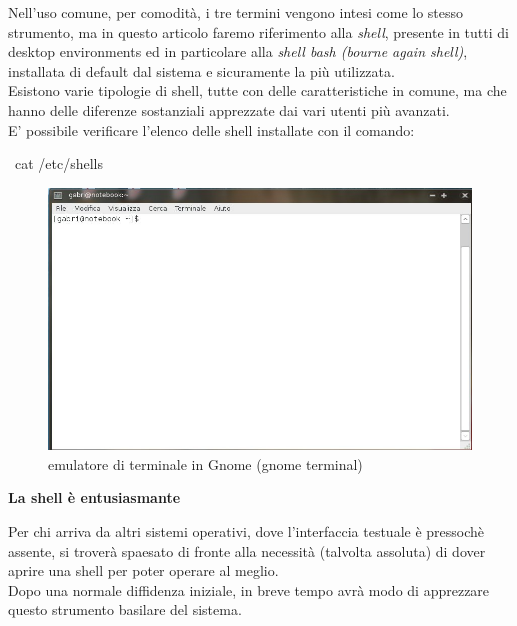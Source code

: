 Nell'uso comune, per comodità, i tre termini vengono intesi come lo stesso strumento, ma in questo articolo faremo riferimento alla {\itshape shell}, presente in tutti di desktop environments ed in particolare alla {\itshape shell bash (bourne again shell)}, installata di default dal sistema e sicuramente la più utilizzata.\\

Esistono varie tipologie di shell, tutte con delle caratteristiche in comune, ma che hanno delle diferenze sostanziali apprezzate dai vari utenti più avanzati.\\

E' possibile verificare l'elenco delle shell installate con il comando:
\begin{shaded}
{\color[cmyk]{0, 0, 0, 0}\textdollar\ cat /etc/shells}
\end{shaded}

\begin{figure}[!htbp]
\centering
\includegraphics[scale=.30]{articoli/primi_passi/immagini/gnome_terminal.jpeg}
\caption{emulatore di terminale in Gnome (gnome terminal)\label{Fig.2: gnome_terminal}}
\end{figure}

\begin{center}
{\centering\bfseries La shell è entusiasmante}
\end{center}

Per chi arriva da altri sistemi operativi, dove l'interfaccia testuale è pressochè assente, si troverà spaesato di fronte alla necessità (talvolta assoluta) di dover aprire una shell per poter operare al meglio.\\

Dopo una normale diffidenza iniziale, in breve tempo avrà modo di apprezzare questo strumento basilare del sistema.\\

